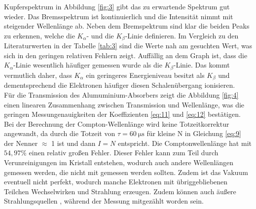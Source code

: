 \justifying Kupferspektrum in Abbildung \ref{fig:3} gibt das zu erwartende Spektrum gut
wieder. Das Bremsspektrum ist kontinuierlich und die Intensität nimmt mit steigender Wellenlänge ab.
Neben dem Bremspektrum sind klar die beiden Peaks zu erkennen, welche die $K_{\alpha} $-
und die $K_{\beta} $-Linie definieren. Im Vergleich zu den Literaturwerten in der Tabelle \ref{tab:3}
sind die Werte nah am gesuchten Wert, was sich in den geringen relativen Fehlern zeigt.
Auffällig an dem Graph ist, dass die $K_{\alpha} $-Linie wesentlich häufiger gemessen wurde
als die $K_{\beta}$-Linie. Das kommt vermutlich daher, dass $K_{\alpha} $ ein
geringeres Energieniveau besitzt als $K_{\beta} $ und dementsprechend die 
Elektronen häufiger diesen Schalenübergang ionisieren.\\
Für die Transmission des Alumuminium-Absorbers zeigt die Abbildung
\ref{fig:4} einen linearen Zusammenhang zwischen Transmission und Wellenlänge,
was die geringen Messungenauigkeiten der Koeffizienten \eqref{eq:11} und \eqref{eq:12}
bestätigen.
Bei der Berechnung der Compton-Wellenlänge wird keine Totzeitkorrektur angewandt,
da durch die Totzeit von $\tau = \SI{60}{\micro\second} $ für kleine N in 
Gleichung \eqref{eq:9} der Nenner $\approx$ 1 ist und dann $I=N$ entspricht.
Die Comptonwellenlänge hat mit $54,97\%$ einen relativ großen Fehler. Dieser Fehler
kann zum Teil  durch Verunreinigungen im Kristall entstehen, wodurch auch andere 
Wellenlängen gemessen werden, die nicht mit gemessen werden sollten.
Zudem ist das Vakuum eventuell nicht perfekt, wodurch manche Elektronen mit
übriggebliebenen Teilchen Wechselwirken und Strahlung erzeugen. Zudem können
auch äußere Strahlungsquellen , während der Messung mitgezählt worden sein.





\newpage
\printbibliography

